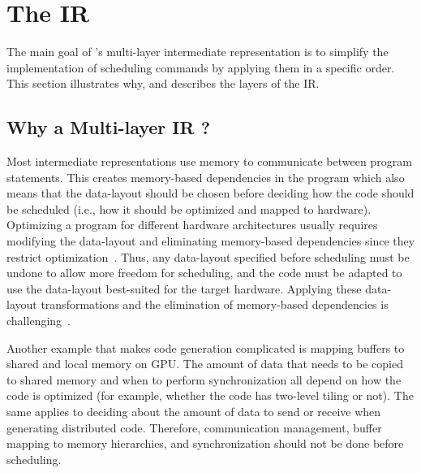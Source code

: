 \vspace{-0.5cm}
\section{\label{sec:ir}The \framework{} IR}
The main goal of \framework{}'s multi-layer intermediate representation is to simplify the implementation of scheduling commands by applying them in a specific order.
This section illustrates why, and describes the layers of the \framework{} IR.

\subsection{Why a Multi-layer IR ?}

Most intermediate representations use memory to communicate between program statements.  This creates memory-based dependencies in the program which also means that the data-layout should be chosen before deciding how the code should be scheduled (i.e., how it should be optimized and mapped to hardware).  Optimizing a program for different hardware architectures usually requires modifying the data-layout and eliminating memory-based dependencies since they restrict optimization~\cite{maydan1992data}.  Thus, any data-layout specified before scheduling must be undone to allow more freedom for scheduling, and the code must be adapted to use the data-layout best-suited for the target hardware.
Applying these data-layout transformations and the elimination of memory-based dependencies is challenging~\cite{gupta1997privatization,autoPrivatPeng,li_array_1992,feautrier_array_1988,midkiff_automatic_2012,maydan_array-data_1993,lefebvre_automatic_1998,Qui00,Darte_contraction_2005}.

Another example that makes code generation complicated is mapping buffers to shared and local memory on GPU.  The amount of data that needs to be copied to shared memory and when to perform synchronization all depend on how the code is optimized (for example,  whether the code has two-level tiling or not).  The same applies to deciding about the amount of data to send or receive when generating distributed code.   Therefore, communication management, buffer mapping to memory hierarchies, and synchronization should not be done before scheduling.

